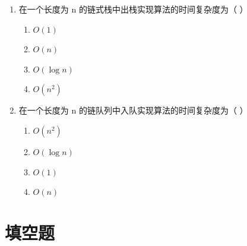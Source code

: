 \documentclass[12pt, a4paper]{article}
\begin{document}
\begin{enumerate}[label=\arabic*.]
	\item 在一个长度为 n 的链式栈中出栈实现算法的时间复杂度为（ ）
	      \begin{enumerate}
		      \item[A.] $O(1)$
		      \item[B.] $O(n)$
		      \item[C.] $O(\log n)$
		      \item[D.] $O(n^2)$
	      \end{enumerate}

	\item 在一个长度为 n 的链队列中入队实现算法的时间复杂度为（ ）
	      \begin{enumerate}
		      \item[A.] $O(n^2)$
		      \item[B.] $O(\log n)$
		      \item[C.] $O(1)$
		      \item[D.] $O(n)$
	      \end{enumerate}
\end{enumerate}

\section*{填空题}
\end{document}
